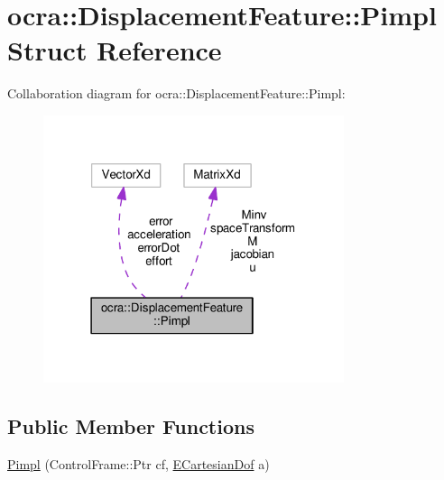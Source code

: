 \hypertarget{structocra_1_1DisplacementFeature_1_1Pimpl}{}\section{ocra\+:\+:Displacement\+Feature\+:\+:Pimpl Struct Reference}
\label{structocra_1_1DisplacementFeature_1_1Pimpl}


Collaboration diagram for ocra\+:\+:Displacement\+Feature\+:\+:Pimpl\+:
\nopagebreak
\begin{figure}[H]
\begin{center}
\leavevmode
\includegraphics[width=250pt]{d1/d74/structocra_1_1DisplacementFeature_1_1Pimpl__coll__graph}
\end{center}
\end{figure}
\subsection*{Public Member Functions}
\begin{DoxyCompactItemize}
\item 
\hyperlink{structocra_1_1DisplacementFeature_1_1Pimpl_a74a8e0493ff78e399aef5f07e4a092e3}{Pimpl} (Control\+Frame\+::\+Ptr cf, \hyperlink{namespaceocra_a436781c7059a0f76027df1c652126260}{E\+Cartesian\+Dof} a)
\end{DoxyCompactItemize}
